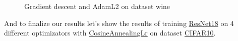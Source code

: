 \documentclass{article}
\begin{document}
\begin{figure}[H]
\begin{minipage}[h]{0.5\linewidth}
\end{minipage}
\hfill
\begin{minipage}[h]{0.5\linewidth}
\end{minipage}
\caption{Gradient descent and AdamL2 on dataset wine}
\label{fig:w_gd_adaml2}
\end{figure}

And to finalize our results let's show the results of training \href{https://pytorch.org/vision/main/models/generated/torchvision.models.resnet18.html}{ResNet18} on 4 different optimizators with \href{https://pytorch.org/docs/stable/generated/torch.optim.lr_scheduler.CosineAnnealingLR.html}{CosineAnnealingLr} on dataset \href{https://www.cs.toronto.edu/~kriz/cifar.html}{CIFAR10}.
\end{document}
